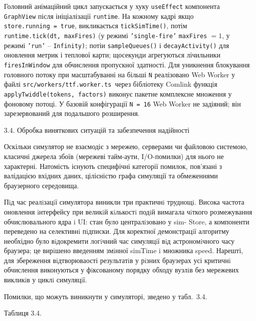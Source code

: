\documentclass[
]{article}
\begin{document}
Головний анімаційний цикл запускається у хуку \texttt{useEffect}
компонента \texttt{GraphView} після ініціалізації \texttt{runtime}. На
кожному кадрі якщо \texttt{store.running}\texttt{\ =\ }\texttt{true},
викликається \texttt{tickSimTime}\texttt{()}, потім
\texttt{runtime.tick}\texttt{(}\texttt{dt}\texttt{,\ }\texttt{maxFires}\texttt{)}
(у режимі \texttt{’}\texttt{single-fire}\texttt{’} \texttt{maxFires}
\(= 1\), у режимі \texttt{’}\texttt{run}\texttt{’} --
\texttt{Infinity}\texttt{)}; потіи \texttt{sampleQueues}\texttt{()} і
\texttt{decayActivity}\texttt{()} для оновлення метрик і теплової карти;
щосекунди агрегуються лічильники \texttt{firesInWindow} для обчислення
пропускної здатності. Для уникнення блокування головного потоку при
масштабуванні на більші \texttt{N} реалізовано Web Worker у файлі
\texttt{src}\texttt{/}\texttt{workers}\texttt{/}\texttt{ttf.worker.ts}\texttt{\ }через
бібліотеку Comlink функція
\texttt{applyTwiddle}\texttt{(}\texttt{tokens}\texttt{,\ }\texttt{factors}\texttt{)}
виконує пакетне комплексне множення у фоновому потоці. У базовій
конфігурації \texttt{N}\texttt{\ =\ 16} Web Worker не задіяний; він
зарезервований для подальшого розширення.

\protect{}\label{_Toc229681146}{}3.4. Обробка виняткових
ситуацій та забезпечення надійності

Оскільки симулятор не взаємодіє з мережею, серверами чи файловою
системою, класичні джерела збоїв (мережеві тайм-аути, I/O-помилки) для
нього не характерні. Натомість існують специфічні категорії помилок,
пов'язані з валідацією вхідних даних, цілісністю графа симуляції та
обмеженнями браузерного середовища.

Пiд час реалiзацiї симулятора виникли три практичнi труднощi. Висока
частота оновлення iнтерфейсу при великiй кiлькостi подiй вимагала
чiткого розмежування обчислювального ядра i UI: стан було централiзовано
у sim- Store, а компоненти переведено на селективнi пiдписки. Для
коректної демонстрацiї алгоритму необхідно було вiдокремити логiчний час
симуляцiї вiд астрономiчного часу браузера; це вирiшено введенням
змiнної simTime i множника speed. Нарешті, для збереження вiдтворюваості
результатiв у рiзних браузерах усі критичнi обчислення виконуються у
фiксованому порядку обходу вузлiв без мережевих викликiв у циклi
симуляцiї.

Помилки, що можуть виникнути у симуляторі, зведено у табл.~3.4.

Таблиця 3.4.
\end{document}
